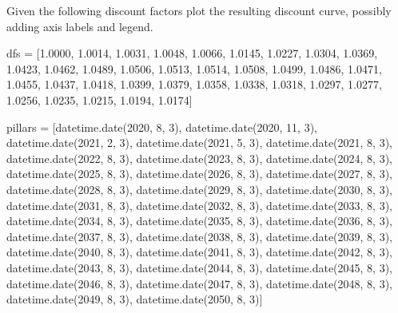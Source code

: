 \cprotEnv\begin{question}
Given the following discount factors plot the resulting discount curve, possibly adding axis labels and legend.

\begin{ipython}
dfs = [1.0000, 1.0014, 1.0031, 1.0048,
       1.0066, 1.0145, 1.0227,
       1.0304, 1.0369, 1.0423,
       1.0462, 1.0489, 1.0506, 
       1.0513, 1.0514, 1.0508,
       1.0499, 1.0486, 1.0471,
       1.0455, 1.0437, 1.0418,
       1.0399, 1.0379, 1.0358,
       1.0338, 1.0318, 1.0297,
       1.0277, 1.0256, 1.0235,
       1.0215, 1.0194, 1.0174]

pillars = [datetime.date(2020, 8, 3), datetime.date(2020, 11, 3),
		   datetime.date(2021, 2, 3), datetime.date(2021, 5, 3),
		   datetime.date(2021, 8, 3), datetime.date(2022, 8, 3),
		   datetime.date(2023, 8, 3), datetime.date(2024, 8, 3),
		   datetime.date(2025, 8, 3), datetime.date(2026, 8, 3),
		   datetime.date(2027, 8, 3), datetime.date(2028, 8, 3),
		   datetime.date(2029, 8, 3), datetime.date(2030, 8, 3),
		   datetime.date(2031, 8, 3), datetime.date(2032, 8, 3),
		   datetime.date(2033, 8, 3), datetime.date(2034, 8, 3),
		   datetime.date(2035, 8, 3), datetime.date(2036, 8, 3),
		   datetime.date(2037, 8, 3), datetime.date(2038, 8, 3),
		   datetime.date(2039, 8, 3), datetime.date(2040, 8, 3),
		   datetime.date(2041, 8, 3), datetime.date(2042, 8, 3),
		   datetime.date(2043, 8, 3), datetime.date(2044, 8, 3),
		   datetime.date(2045, 8, 3), datetime.date(2046, 8, 3),
		   datetime.date(2047, 8, 3), datetime.date(2048, 8, 3),
           datetime.date(2049, 8, 3), datetime.date(2050, 8, 3)]
\end{ipython}
\end{question}

